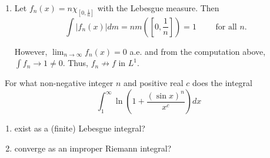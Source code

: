 \documentclass[12pt]{Homework}
\begin{document}
\begin{solution}
\begin{enumerate}[label=(\alph*)]
\begin{comment}
    Finally, since $\varepsilon$ was arbitrary, the above limit is zero and we are done.
\end{comment}
    \item Let $f_n(x)=n\chi_{[0,\frac{1}{n}]}$ with the Lebesgue measure. Then $$\int |f_n(x)|dm=nm\left(\left[0,\frac{1}{n}\right]\right)=1\qquad\text{ for all }n.$$
    
    However, $\displaystyle\lim_{n\to\infty}f_n(x)=0$ a.e. and from the computation above, $\int f_n\to1\not=0$. Thus, $f_n\not\to f$ in $L^1$.
\end{enumerate}
\end{solution}
\newpage

\begin{problem} $\,$
For what non-negative integer $n$ and positive real $c$ does the integral $$\int_1^\infty\ln\left(1+\frac{(\sin x)^n}{x^c}\right)dx$$
\begin{enumerate}[label=(\alph*)]
    \item exist as a (finite) Lebesgue integral?
    \item converge as an improper Riemann integral?
\end{enumerate}
\end{problem}
\end{document}
